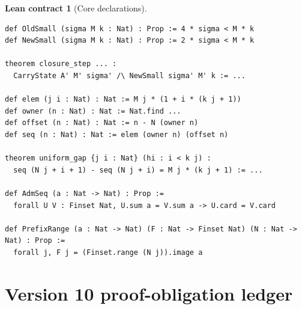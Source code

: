 \documentclass[11pt]{article}
\theoremstyle{definition}
\newtheorem{contract}[definition]{Lean contract}
\theoremstyle{plain}
\theoremstyle{remark}
\begin{document}
\begin{contract}[Core declarations]
\begin{verbatim}
def OldSmall (sigma M k : Nat) : Prop := 4 * sigma < M * k
def NewSmall (sigma M k : Nat) : Prop := 2 * sigma < M * k

theorem closure_step ... :
  CarryState A' M' sigma' /\ NewSmall sigma' M' k := ...

def elem (j i : Nat) : Nat := M j * (1 + i * (k j + 1))
def owner (n : Nat) : Nat := Nat.find ...
def offset (n : Nat) : Nat := n - N (owner n)
def seq (n : Nat) : Nat := elem (owner n) (offset n)

theorem uniform_gap {j i : Nat} (hi : i < k j) :
  seq (N j + i + 1) - seq (N j + i) = M j * (k j + 1) := ...

def AdmSeq (a : Nat -> Nat) : Prop :=
  forall U V : Finset Nat, U.sum a = V.sum a -> U.card = V.card

def PrefixRange (a : Nat -> Nat) (F : Nat -> Finset Nat) (N : Nat -> Nat) : Prop :=
  forall j, F j = (Finset.range (N j)).image a
\end{verbatim}
\end{contract}

\section{Version 10 proof-obligation ledger}
\end{document}
